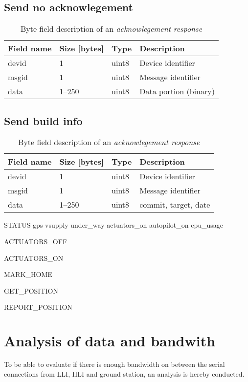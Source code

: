 \subsection{Send no acknowlegement}
\begin{table}[h]
	\centering
	\begin{tabular}{llll}
		\toprule
		\textbf{Field name} & \textbf{Size [bytes]} & \textbf{Type} & \textbf{Description}\\
		\midrule
		devid & 1 & uint8 & Device identifier \\
		msgid & 1 & uint8 & Message identifier \\
		data & 1--250 & uint8 & Data portion (binary)\\
		\bottomrule
	\end{tabular}
	\caption{Byte field description of an \textit{acknowlegement response}}
	\label{tab:ack}
\end{table}

\subsection{Send build info}
\begin{table}[h]
	\centering
	\begin{tabular}{llll}
		\toprule
		\textbf{Field name} & \textbf{Size [bytes]} & \textbf{Type} & \textbf{Description}\\
		\midrule
		devid & 1 & uint8 & Device identifier \\
		msgid & 1 & uint8 & Message identifier \\
		data & 1--250 & uint8 & commit, target, date\\
		\bottomrule
	\end{tabular}
	\caption{Byte field description of an \textit{acknowlegement response}}
	\label{tab:ack}
\end{table}


STATUS
gps
vsupply
under\_way
actuators\_on
autopilot\_on
cpu\_usage

ACTUATORS\_OFF

ACTUATORS\_ON

MARK\_HOME

GET\_POSITION

REPORT\_POSITION


\section{Analysis of data and bandwith}
\label{sec:lli-bandwith}
To be able to evaluate if there is enough bandwidth on between the serial connections from LLI, HLI and ground station, an analysis is hereby conducted.

